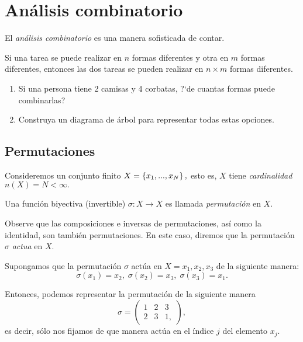 \section{Análisis combinatorio}

El \emph{análisis combinatorio} es una manera sofisticada de contar.

\begin{proposicion}
	Si una tarea se puede realizar en $n$ formas diferentes y otra en $m$ formas diferentes, entonces las dos tareas se pueden realizar en $n\times m$ formas diferentes.	
\end{proposicion}

\begin{problema}
	\label{exmp:1.14}
\begin{enumerate}
	\item Si una persona tiene 2 camisas y 4 corbatas, ?`de cuantas formas puede combinarlas?
	\item Construya un diagrama de árbol para representar todas estas opciones.
\end{enumerate}
\end{problema}

\subsection{Permutaciones}

Consideremos un conjunto finito $X=\left\{ x_{1},...,x_{N} \right\},$ esto es, $X$ tiene \emph{cardinalidad} $n(X)=N < \infty.$

Una función biyectiva (invertible) $\sigma:X \to X$ es llamada \emph{permutación} en $X.$

Observe que las composiciones e inversas de permutaciones, así como la identidad, son tambi\'en permutaciones. En este caso, diremos que la permutación $\sigma$ \emph{actua} en $X.$

Supongamos que la permutación $\sigma$ actúa en $X={x_{1},x_{2},x_{3}}$ de la siguiente manera:
$$
\sigma(x_{1})=x_{2}, \; \sigma(x_{2})=x_{3}, \; \sigma(x_{3})=x_{1}.
$$

Entonces, podemos representar la permutación de la siguiente manera
$$\sigma=
\begin{pmatrix}
	1 & 2 & 3 \\
	2 & 3 & 1,
\end{pmatrix},
$$  es decir, sólo nos fijamos de que manera actúa en el índice $j$ del elemento $x_{j}.$



